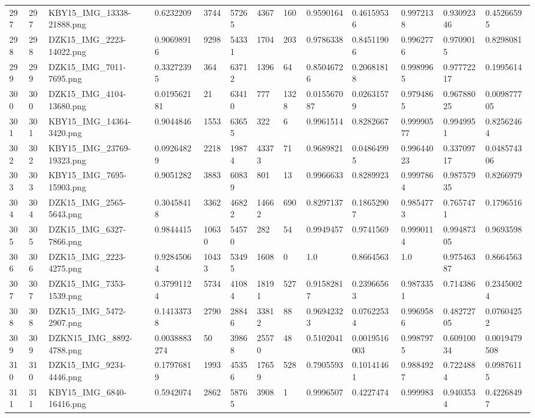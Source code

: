 \documentclass[11pt, a4paper, twoside]{report}
\begin{document}
\begin{longtable}[c]{@{}lllllllllllll@{}}
297 & 297 & KBY15\_IMG\_13338-21888.png & 0.6232209 & 3744 & 57265 & 4367 & 160 & 0.9590164 & 0.46159536 & 0.9972138 & 0.93092346 & 0.45266595 \\
298 & 298 & DZK15\_IMG\_2223-14022.png & 0.90698916 & 9298 & 54331 & 1704 & 203 & 0.9786338 & 0.84511906 & 0.9962776 & 0.9709015 & 0.8298081 \\
299 & 299 & DZK15\_IMG\_7011-7695.png & 0.33272395 & 364 & 63712 & 1396 & 64 & 0.85046726 & 0.20681818 & 0.9989965 & 0.97772217 & 0.1995614 \\
300 & 300 & DZK15\_IMG\_4104-13680.png & 0.019562181 & 21 & 63410 & 777 & 1328 & 0.015567087 & 0.02631579 & 0.9794865 & 0.96788025 & 0.009877705 \\
301 & 301 & KBY15\_IMG\_14364-3420.png & 0.9044846 & 1553 & 63655 & 322 & 6 & 0.9961514 & 0.8282667 & 0.99990577 & 0.9949951 & 0.82562464 \\
302 & 302 & KBY15\_IMG\_23769-19323.png & 0.09264829 & 2218 & 19874 & 43373 & 71 & 0.9689821 & 0.04864995 & 0.99644023 & 0.33709717 & 0.048574306 \\
303 & 303 & KBY15\_IMG\_7695-15903.png & 0.9051282 & 3883 & 60839 & 801 & 13 & 0.9966633 & 0.8289923 & 0.9997864 & 0.98757935 & 0.8266979 \\
304 & 304 & DZK15\_IMG\_2565-5643.png & 0.30458418 & 3362 & 46822 & 14662 & 690 & 0.8297137 & 0.18652907 & 0.9854773 & 0.7657471 & 0.1796516 \\
305 & 305 & DZK15\_IMG\_6327-7866.png & 0.9844415 & 10630 & 54570 & 282 & 54 & 0.9949457 & 0.9741569 & 0.9990114 & 0.99487305 & 0.9693598 \\
306 & 306 & DZK15\_IMG\_2223-4275.png & 0.92845064 & 10433 & 53495 & 1608 & 0 & 1.0 & 0.8664563 & 1.0 & 0.97546387 & 0.8664563 \\
307 & 307 & DZK15\_IMG\_7353-1539.png & 0.37991124 & 5734 & 41084 & 18191 & 527 & 0.91582817 & 0.23966563 & 0.9873351 & 0.714386 & 0.23450024 \\
308 & 308 & DZK15\_IMG\_5472-2907.png & 0.14133738 & 2790 & 28846 & 33812 & 88 & 0.96942323 & 0.07622534 & 0.9969586 & 0.48272705 & 0.07604252 \\
309 & 309 & DZKN15\_IMG\_8892-4788.png & 0.0038883274 & 50 & 39868 & 25570 & 48 & 0.5102041 & 0.0019516003 & 0.9987975 & 0.60910034 & 0.0019479508 \\
310 & 310 & DZK15\_IMG\_9234-4446.png & 0.17976819 & 1993 & 45356 & 17659 & 528 & 0.7905593 & 0.10141461 & 0.9884927 & 0.7224884 & 0.09876115 \\
311 & 311 & KBY15\_IMG\_6840-16416.png & 0.5942074 & 2862 & 58765 & 3908 & 1 & 0.9996507 & 0.4227474 & 0.999983 & 0.9403534 & 0.42268497 \\

\end{longtable}
\end{document}
